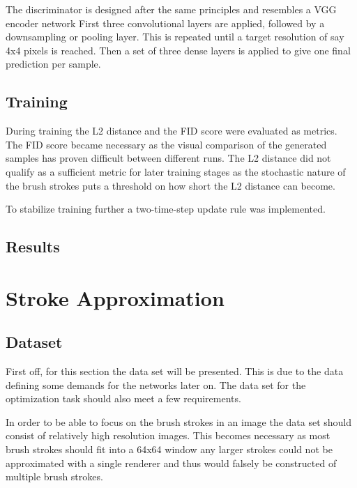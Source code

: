 The discriminator is designed after the same principles and resembles a VGG encoder
network
First three convolutional layers are applied, followed by a downsampling or pooling layer.
This is repeated until a target resolution of say 4x4 pixels is reached.
Then a set of three dense layers is applied to give one final prediction per sample.

\subsection{Training}
During training the L2 distance and the FID score were evaluated as metrics.
The FID score became necessary as the visual comparison of the generated samples
has proven difficult between different runs.
The L2 distance did not qualify as a sufficient metric for later training stages
as the stochastic nature of the brush strokes puts a threshold on how short the L2
distance can become.

To stabilize training further a two-time-step update rule was implemented.

\subsection{Results}


\section{Stroke Approximation}

\subsection{Dataset}
First off, for this section the data set will be presented.
This is due to the data defining some demands for the networks later on.
The data set for the optimization task should also meet a few requirements.

In order to be able to focus on the brush strokes in an image the data set should
consist of relatively high resolution images.
This becomes necessary as most brush strokes should fit into a 64x64 window any larger
strokes could not be approximated with a single renderer and thus would falsely be constructed
of multiple brush strokes.

